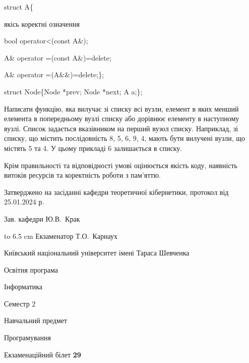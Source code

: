 \documentclass[12pt, ukrainian]{article}
\begin{document}
{struct A\{

\quad  якісь коректні означення 

\quad  bool operator<(const A\&); 

\quad A\& operator =(const A\&)=delete; 

\quad  A\& operator =(A\&\&)=delete;\};

struct Node\{Node *prev; Node *next; A a;\};

Написати функцію, яка вилучає зі списку всі вузли, елемент в яких менший елемента в попередньому вузлі списку або дорівнює елементу в наступному вузлі. Список задається вказівником на перший вузол списку. Наприклад, зі списку, що містить послідовність 8, 5, 6, 9, 4, мають бути вилучені вузли, що містять 5 та 4. У цьому прикладі 6 залишається в списку.

Крім правильності та відповідності умові оцінюється якість коду, наявність витоків ресурсів та коректність роботи з пам'яттю. 

}
{\smallskip\smallskip \begin {scriptsize} Затверджено на засіданні кафедри теоретичної кібернетики, протокол   від   25.01.2024 р.\par\smallskip\smallskip\smallskip\smallskip
{\parbox {6.5 cm} {Зав. кафедри \dotfill Ю.В.~Крак}}\hspace {0.7cm} {\hbox to 6.5 cm { Екзаменатор \dotfill Т.О.~Карнаух}} \end{scriptsize}}
\newpage
{{\begin {scriptsize}\par
{ \center  Київський національний університет імені Тараса Шевченка \par}
{\parbox {5 cm}{Освітня програма \hfill}{\parbox {7 cm}{Інформатика\hfill}}\parbox {6 cm}{\hfill Семестр 2}}\par
{\parbox {5 cm} {Навчальний предмет \hfill}\parbox {7 cm}{Програмування \hfill}\parbox {6cm}{\hfill}\par}\vspace{-15pt} \end{scriptsize}}{\center Екзаменаційний білет \No \textbf { 29 }\par}}
\end{document}
